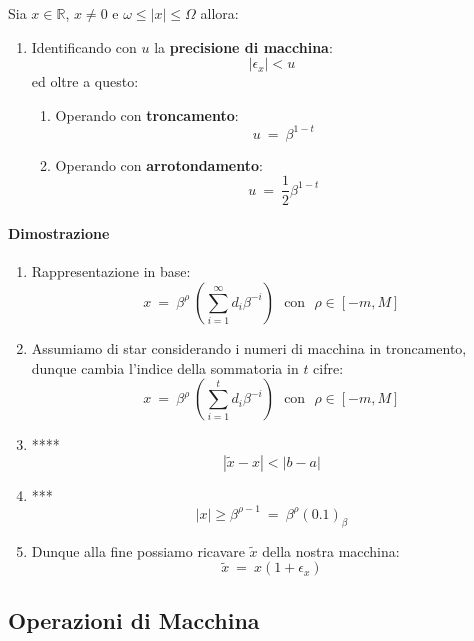\documentclass{article}
\begin{document}
Sia $x \in \mathbb{R}$, $x \neq 0$ e $\omega \leq |x| \leq \Omega$ allora:

\begin{enumerate}
    \item Identificando con $u$ la \textbf{precisione di macchina}:
    \[ |\epsilon_{x}| < u \]
    ed oltre a questo:
    \begin{enumerate}
        \item Operando con \textbf{troncamento}:
        \[ u \: = \: \beta^{1-t} \]
        \item Operando con \textbf{arrotondamento}:
        \[ u \: = \: \frac{1}{2}\beta^{1-t} \]
    \end{enumerate}
\end{enumerate}

\newpage

\paragraph{Dimostrazione}

\begin{enumerate}
    \item Rappresentazione in base: 
    \[ x \: = \: \beta^{\rho} \: (\sum^{\infty}_{i=1} d_{i}\beta^{-i}) \:\:\: \text{con} \:\:\: \rho \in [-m,M] \]
    \item Assumiamo di star considerando i numeri di macchina in troncamento, dunque cambia l'indice della sommatoria in $t$ cifre:
    \[ x \: = \: \beta^{\rho} \: (\sum^{t}_{i=1} d_{i}\beta^{-i}) \:\:\: \text{con} \:\:\: \rho \in [-m,M] \]
    \item ****
    \[ |\tilde{x} - x| < |b-a| \]
    \item ***
    \[ |x| \geq \beta^{\rho-1} \: = \: \beta^{\rho}(0.1)_{\beta} \]
    \item Dunque alla fine possiamo ricavare $\tilde{x}$ della nostra macchina:
    \[ \boxed{\tilde{x} \: = \: x(1+\epsilon_{x})} \]
\end{enumerate}

\newpage

\subsection{Operazioni di Macchina}
\end{document}
